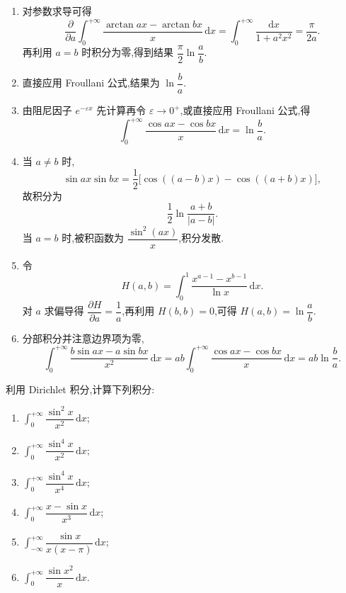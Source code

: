 \begin{solution}
  \begin{enumerate}
    \item 对参数求导可得
          \[
            \dfrac{\partial}{\partial a}
            \int_0^{+\infty}\dfrac{\arctan ax-\arctan bx}{x}\,\mathrm{d}x
            =\int_0^{+\infty}\dfrac{\mathrm{d}x}{1+a^2x^2}=\dfrac{\pi}{2a}.
          \]
          再利用 $a=b$ 时积分为零,得到结果 $\dfrac{\pi}{2}\ln\dfrac{a}{b}$.

    \item 直接应用 Froullani 公式,结果为 $\ln\dfrac{b}{a}$.

    \item 由阻尼因子 $e^{-\varepsilon x}$ 先计算再令 $\varepsilon\to0^+$,或直接应用
          Froullani 公式,得
          \[
            \int_0^{+\infty}\dfrac{\cos ax-\cos bx}{x}\,\mathrm{d}x
            =\ln\dfrac{b}{a}.
          \]

    \item 当 $a\neq b$ 时,
          \[
            \sin ax\sin bx=\dfrac{1}{2}\bigl[\cos((a-b)x)-\cos((a+b)x)\bigr],
          \]
          故积分为
          \[
            \dfrac{1}{2}\ln\dfrac{a+b}{|a-b|}.
          \]
          当 $a=b$ 时,被积函数为 $\dfrac{\sin^2(ax)}{x}$,积分发散.

    \item 令
          \[
            H(a,b)=\int_0^1\dfrac{x^{a-1}-x^{b-1}}{\ln x}\,\mathrm{d}x.
          \]
          对 $a$ 求偏导得 $\dfrac{\partial H}{\partial a}=\dfrac{1}{a}$,再利用
          $H(b,b)=0$,可得 $H(a,b)=\ln\dfrac{a}{b}$.

    \item 分部积分并注意边界项为零,
          \[
            \int_0^{+\infty}\dfrac{b\sin ax-a\sin bx}{x^2}\,\mathrm{d}x
            =ab\int_0^{+\infty}\dfrac{\cos ax-\cos bx}{x}\,\mathrm{d}x
            =ab\ln\dfrac{b}{a}.
          \]
  \end{enumerate}
\end{solution}

\begin{example}
  利用 Dirichlet 积分,计算下列积分:
  \begin{enumerate}
    \item $\displaystyle\int_0^{+\infty}\dfrac{\sin^2x}{x^2}\,\mathrm{d}x$;
    \item $\displaystyle\int_0^{+\infty}\dfrac{\sin^4x}{x^2}\,\mathrm{d}x$;
    \item $\displaystyle\int_0^{+\infty}\dfrac{\sin^4x}{x^4}\,\mathrm{d}x$;
    \item $\displaystyle\int_0^{+\infty}\dfrac{x-\sin x}{x^3}\,\mathrm{d}x$;
    \item $\displaystyle\int_{-\infty}^{+\infty}\dfrac{\sin x}{x(x-\pi)}\,\mathrm{d}x$;
    \item $\displaystyle\int_0^{+\infty}\dfrac{\sin x^2}{x}\,\mathrm{d}x$.
  \end{enumerate}
\end{example}
\exampleblank

